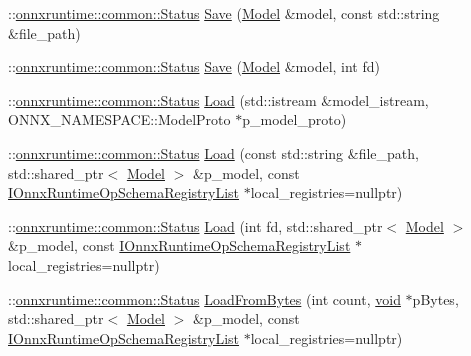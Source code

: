 \begin{DoxyCompactItemize}
\item 
\+::\mbox{\hyperlink{classonnxruntime_1_1common_1_1Status}{onnxruntime\+::common\+::\+Status}} \mbox{\hyperlink{classonnxruntime_1_1Model_a9fc3f53be6d48631d4e97add2381abf5}{Save}} (\mbox{\hyperlink{classonnxruntime_1_1Model}{Model}} \&model, const std\+::string \&file\+\_\+path)
\item 
\+::\mbox{\hyperlink{classonnxruntime_1_1common_1_1Status}{onnxruntime\+::common\+::\+Status}} \mbox{\hyperlink{classonnxruntime_1_1Model_a9ce245a1c4fa29450c37a5ffab2743c7}{Save}} (\mbox{\hyperlink{classonnxruntime_1_1Model}{Model}} \&model, int fd)
\item 
\+::\mbox{\hyperlink{classonnxruntime_1_1common_1_1Status}{onnxruntime\+::common\+::\+Status}} \mbox{\hyperlink{classonnxruntime_1_1Model_aee6c392788aa2baf2086f03032b21a3b}{Load}} (std\+::istream \&model\+\_\+istream, O\+N\+N\+X\+\_\+\+N\+A\+M\+E\+S\+P\+A\+C\+E\+::\+Model\+Proto $\ast$p\+\_\+model\+\_\+proto)
\item 
\+::\mbox{\hyperlink{classonnxruntime_1_1common_1_1Status}{onnxruntime\+::common\+::\+Status}} \mbox{\hyperlink{classonnxruntime_1_1Model_a629f04ffae1930227a4dbe3591ff2f98}{Load}} (const std\+::string \&file\+\_\+path, std\+::shared\+\_\+ptr$<$ \mbox{\hyperlink{classonnxruntime_1_1Model}{Model}} $>$ \&p\+\_\+model, const \mbox{\hyperlink{namespaceonnxruntime_a37a91305e7190e83fa9c66117a6a4746}{I\+Onnx\+Runtime\+Op\+Schema\+Registry\+List}} $\ast$local\+\_\+registries=nullptr)
\item 
\+::\mbox{\hyperlink{classonnxruntime_1_1common_1_1Status}{onnxruntime\+::common\+::\+Status}} \mbox{\hyperlink{classonnxruntime_1_1Model_ae2bc651564a923b007c572bee3f7e69d}{Load}} (int fd, std\+::shared\+\_\+ptr$<$ \mbox{\hyperlink{classonnxruntime_1_1Model}{Model}} $>$ \&p\+\_\+model, const \mbox{\hyperlink{namespaceonnxruntime_a37a91305e7190e83fa9c66117a6a4746}{I\+Onnx\+Runtime\+Op\+Schema\+Registry\+List}} $\ast$local\+\_\+registries=nullptr)
\item 
\+::\mbox{\hyperlink{classonnxruntime_1_1common_1_1Status}{onnxruntime\+::common\+::\+Status}} \mbox{\hyperlink{classonnxruntime_1_1Model_a206de3652da23ea5115c292510248da9}{Load\+From\+Bytes}} (int count, \mbox{\hyperlink{mlasi_8h_a88f941d423cb2a819b70a1358982b1a6}{void}} $\ast$p\+Bytes, std\+::shared\+\_\+ptr$<$ \mbox{\hyperlink{classonnxruntime_1_1Model}{Model}} $>$ \&p\+\_\+model, const \mbox{\hyperlink{namespaceonnxruntime_a37a91305e7190e83fa9c66117a6a4746}{I\+Onnx\+Runtime\+Op\+Schema\+Registry\+List}} $\ast$local\+\_\+registries=nullptr)

\end{DoxyCompactItemize}
